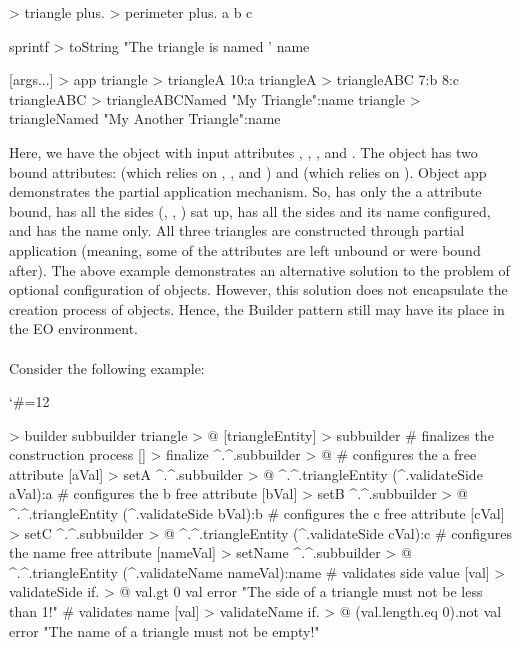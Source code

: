 \documentclass[12pt]{book}
\begin{document}
{{\begin{ffcode}
[a b c name] > triangle
  plus. > perimeter
    plus.
      a
      b
    c

  sprintf > toString
    "The triangle is named '%
    name


[args...] > app
  triangle > triangleA
    10:a
  triangleA > triangleABC
    7:b
    8:c
  triangleABC > triangleABCNamed
    "My Triangle":name
  triangle > triangleNamed
    "My Another Triangle":name

\end{ffcode}

Here, we have the  object with input attributes , , , and . The  object has two bound attributes:  (which relies on , , and ) and  (which relies on ). Object app demonstrates the partial application mechanism. So,  has only the a attribute bound,  has all the sides (, , ) sat up,  has all the sides and its name configured, and  has the name only. All three triangles are constructed through partial application (meaning, some of the attributes are left unbound or were bound after). The above example demonstrates an alternative solution to the problem of optional configuration of objects. However, this solution does not encapsulate the creation process of objects. Hence, the Builder pattern still may have its place in the EO environment.
\\
\\
Consider the following example:

\catcode`\#=12\relax
{}

\begin{ffcode}
[] > builder
  subbuilder triangle > @
  [triangleEntity] > subbuilder
    # finalizes the construction process
    [] > finalize
      ^.^.subbuilder > @
    # configures the a free attribute
    [aVal] > setA
      ^.^.subbuilder > @
        ^.^.triangleEntity
          (^.validateSide aVal):a
    # configures the b free attribute
    [bVal] > setB
      ^.^.subbuilder > @
        ^.^.triangleEntity
          (^.validateSide bVal):b
    # configures the c free attribute
    [cVal] > setC
      ^.^.subbuilder > @
        ^.^.triangleEntity
          (^.validateSide cVal):c
    # configures the name free attribute
    [nameVal] > setName
      ^.^.subbuilder > @
        ^.^.triangleEntity
          (^.validateName nameVal):name
    # validates side value
    [val] > validateSide
      if. > @
        val.gt 0
        val
        error
          "The side of a triangle must not be less than 1!"
    # validates name
    [val] > validateName
      if. > @
        (val.length.eq 0).not
        val
        error
          "The name of a triangle must not be empty!"


\end{ffcode}}}
\end{document}
